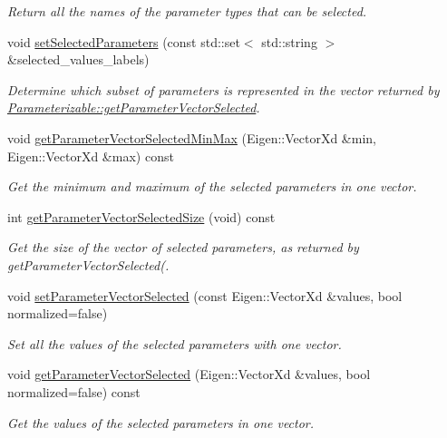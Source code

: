 \begin{DoxyCompactItemize}
\begin{DoxyCompactList}\small\item\em Return all the names of the parameter types that can be selected. \end{DoxyCompactList}\item 
void \hyperlink{classDmpBbo_1_1FunctionApproximator_a8a976b5db2d1809ece10e431816f0f27}{set\+Selected\+Parameters} (const std\+::set$<$ std\+::string $>$ \&selected\+\_\+values\+\_\+labels)
\begin{DoxyCompactList}\small\item\em Determine which subset of parameters is represented in the vector returned by \hyperlink{classDmpBbo_1_1Parameterizable_aab955bec57f074a991b8be31d6ce54ca}{Parameterizable\+::get\+Parameter\+Vector\+Selected}. \end{DoxyCompactList}\item 
void \hyperlink{classDmpBbo_1_1FunctionApproximator_a83d42bcdb0962117720b028baecbfbcf}{get\+Parameter\+Vector\+Selected\+Min\+Max} (Eigen\+::\+Vector\+Xd \&min, Eigen\+::\+Vector\+Xd \&max) const 
\begin{DoxyCompactList}\small\item\em Get the minimum and maximum of the selected parameters in one vector. \end{DoxyCompactList}\item 
int \hyperlink{classDmpBbo_1_1FunctionApproximator_ae83cb950bcf5219841e6ca8511ac2907}{get\+Parameter\+Vector\+Selected\+Size} (void) const 
\begin{DoxyCompactList}\small\item\em Get the size of the vector of selected parameters, as returned by get\+Parameter\+Vector\+Selected(. \end{DoxyCompactList}\item 
void \hyperlink{classDmpBbo_1_1FunctionApproximator_aee501e63a46d63eb58a6f271bf093b9d}{set\+Parameter\+Vector\+Selected} (const Eigen\+::\+Vector\+Xd \&values, bool normalized=false)
\begin{DoxyCompactList}\small\item\em Set all the values of the selected parameters with one vector. \end{DoxyCompactList}\item 
void \hyperlink{classDmpBbo_1_1FunctionApproximator_aab955bec57f074a991b8be31d6ce54ca}{get\+Parameter\+Vector\+Selected} (Eigen\+::\+Vector\+Xd \&values, bool normalized=false) const 
\begin{DoxyCompactList}\small\item\em Get the values of the selected parameters in one vector. \end{DoxyCompactList}\item 

\end{DoxyCompactItemize}
